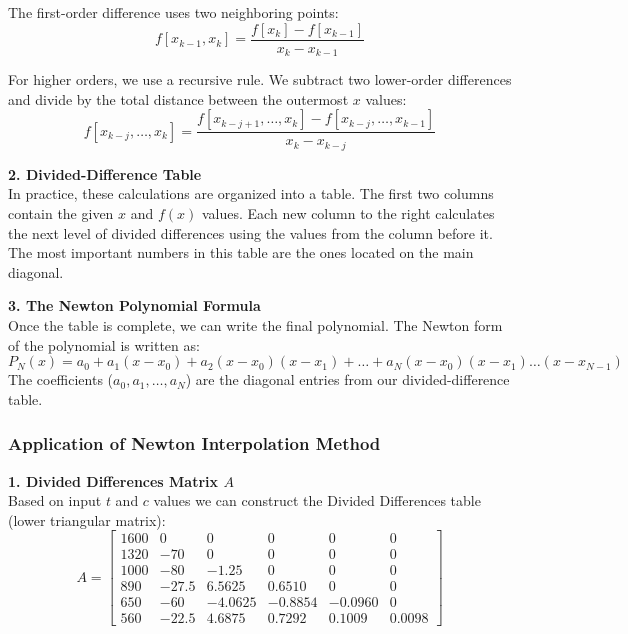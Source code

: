The first-order difference uses two neighboring points:
\begin{equation*}
    f[x_{k-1}, x_k] = \frac{f[x_k] - f[x_{k-1}]}{x_k - x_{k-1}}
\end{equation*}

For higher orders, we use a recursive rule. We subtract two lower-order differences and divide by the total distance between the outermost $x$ values:
\begin{equation*}
    f[x_{k-j}, \dots, x_k] = \frac{f[x_{k-j+1}, \dots, x_k] - f[x_{k-j}, \dots, x_{k-1}]}{x_k - x_{k-j}}
\end{equation*}

\vspace{5pt}
\noindent\textbf{2. Divided-Difference Table} \cite[page 224]{MathewsFink2003} \\
In practice, these calculations are organized into a table. The first two columns contain the given $x$ and $f(x)$ values. Each new column to the right calculates the next level of divided differences using the values from the column before it. The most important numbers in this table are the ones located on the main diagonal.

\vspace{5pt}
\noindent\textbf{3. The Newton Polynomial Formula} \cite[page 220 - 221]{MathewsFink2003} \\
Once the table is complete, we can write the final polynomial. The Newton form of the polynomial is written as:
\begin{equation}
    P_N(x) = a_0 + a_1(x - x_0) + a_2(x - x_0)(x - x_1) + \dots + a_N(x - x_0)(x - x_1)\dots(x - x_{N-1})
\end{equation}
The coefficients ($a_0, a_1, \dots, a_N$) are the diagonal entries from our divided-difference table.

\vspace{5pt}
\subsubsection{Application of Newton Interpolation Method}
\noindent\textbf{1. Divided Differences Matrix $A$} \\
Based on input $t$ and $c$ values we can construct the Divided Differences table (lower triangular matrix):
\begin{equation*}
    A = \begin{bmatrix} 
        1600 & 0 & 0 & 0 & 0 & 0 \\ 
        1320 & -70 & 0 & 0 & 0 & 0 \\ 
        1000 & -80 & -1.25 & 0 & 0 & 0 \\ 
        890 & -27.5 & 6.5625 & 0.6510 & 0 & 0 \\ 
        650 & -60 & -4.0625 & -0.8854 & -0.0960 & 0 \\ 
        560 & -22.5 & 4.6875 & 0.7292 & 0.1009 & 0.0098 
    \end{bmatrix}
\end{equation*}

